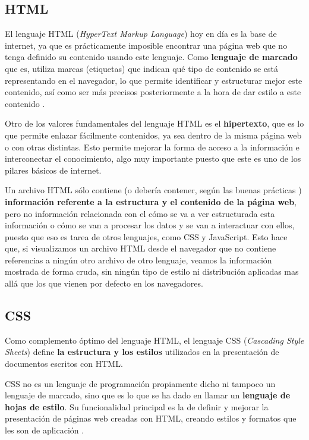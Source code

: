 \subsection{HTML}

El lenguaje HTML (\textit{HyperText Markup Language}) hoy en día es la base de internet, ya que es prácticamente imposible encontrar una página web que no tenga definido su contenido usando este lenguaje. Como \textbf{lenguaje de marcado} que es, utiliza marcas (etiquetas) que indican qué tipo de contenido se está representando en el navegador, lo que permite identificar y estructurar mejor este contenido, así como ser más precisos posteriormente a la hora de dar estilo a este contenido \cite{mdn:html}.

Otro de los valores fundamentales del lenguaje HTML es el \textbf{hipertexto}, que es lo que permite enlazar fácilmente contenidos, ya sea dentro de la misma página web o con otras distintas. Esto permite mejorar la forma de acceso a la información e interconectar el conocimiento, algo muy importante puesto que este es uno de los pilares básicos de internet.

Un archivo HTML sólo contiene (o debería contener, según las buenas prácticas \cite{midudev:html}) \textbf{información referente a la estructura y el contenido de la página web}, pero no información relacionada con el cómo se va a ver estructurada esta información o cómo se van a procesar los datos y se van a interactuar con ellos, puesto que eso es tarea de otros lenguajes, como CSS y JavaScript. Esto hace que, si visualizamos un archivo HTML desde el navegador que no contiene referencias a ningún otro archivo de otro lenguaje, veamos la información mostrada de forma cruda, sin ningún tipo de estilo ni distribución aplicadas mas allá que los que vienen por defecto en los navegadores.

\subsection{CSS}

Como complemento óptimo del lenguaje HTML, el lenguaje CSS (\textit{Cascading Style Sheets}) define \textbf{la estructura y los estilos} utilizados en la presentación de documentos escritos con HTML.

CSS no es un lenguaje de programación propiamente dicho ni tampoco un lenguaje de marcado, sino que es lo que se ha dado en llamar un \textbf{lenguaje de hojas de estilo}. Su funcionalidad principal es la de definir y mejorar la presentación de páginas web creadas con HTML, creando estilos y formatos que les son de aplicación \cite{mdn:css}.

